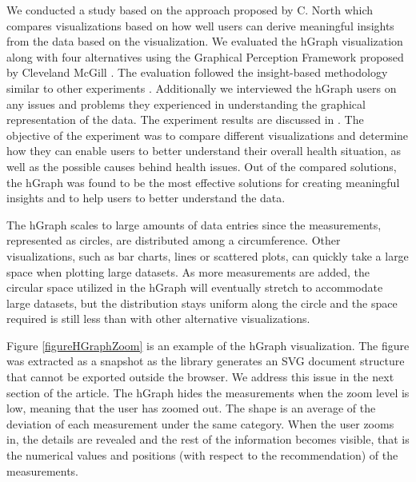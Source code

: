 \documentclass[twocolumn]{bmcart}%
\begin{document}
We conducted a study based on the approach proposed by C. North \cite{north2006toward} which compares visualizations based on how well users can derive meaningful insights from the data based on the visualization. We evaluated the hGraph visualization along with four alternatives using the Graphical Perception Framework proposed by Cleveland McGill \cite{cleveland1984graphical}. The evaluation followed the insight-based methodology similar to other experiments \cite{saraiya2004evaluation}. Additionally we interviewed the hGraph users on any issues and problems they experienced in understanding the graphical representation of the data. The experiment results are discussed in \cite{EMBCLedNiem}. The objective of the experiment was to compare different visualizations and determine how they can enable users to better understand their overall health situation, as well as the possible causes behind health issues. Out of the compared solutions, the hGraph was found to be the most effective solutions for creating meaningful insights and to help users to better understand the data.



The hGraph scales to large amounts of data entries since the measurements, represented as circles, are distributed among a circumference. Other visualizations, such as bar charts, lines or scattered plots, can quickly take a large space when plotting large datasets. As more measurements are added, the circular space utilized in the hGraph will eventually stretch to accommodate large datasets, but the distribution stays uniform along the circle and the space required is still less than with other alternative visualizations.

Figure \ref{figureHGraphZoom} is an example of the hGraph visualization. The figure was extracted as a snapshot as the library generates an SVG document structure that cannot be exported outside the browser. We address this issue in the next section of the article. The hGraph hides the measurements when the zoom level is low, meaning that the user has zoomed out. The shape is an average of the deviation of each measurement under the same category. When the user zooms in, the details are revealed and the rest of the information becomes visible, that is the numerical values and positions (with respect to the recommendation) of the measurements.
\end{document}
